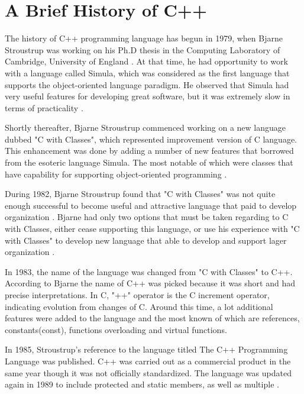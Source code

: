 \documentclass[11pt]{report}
\begin{document}
\section{A Brief History of C++}
\label{sec: History of C++}
The history of C++ programming language has begun in 1979, when Bjarne Stroustrup was working on his Ph.D thesis in the Computing Laboratory of Cambridge, University of England \cite{StroustrupHistory}. At that time, he had opportunity to work with a language called Simula, which was considered as the first language that supports the object-oriented language paradigm. He observed that Simula had very useful features for developing great software, but it was extremely slow in terms of practicality \cite{Stroustrup:2012:Cpp11}.

Shortly thereafter, Bjarne Stroustrup commenced working on a new language dubbed "C with Classes", which represented improvement version of C language. This enhancement was done by adding a number of new features that borrowed from the esoteric language Simula. The most notable of which were classes that have capability for supporting object-oriented programming \cite{StroustrupHistory}. 

During 1982, Bjarne Stroustrup found that "C with Classes" was not quite enough successful to become useful and attractive language that paid to develop organization \cite{StroustrupHistory}. Bjarne had only two options that must be taken regarding to C with Classes, either cease supporting this language, or use his experience with "C with Classes" to develop new language that able to develop and support lager organization \cite{Stroustrup:1994:DesignEvolution}.

In 1983, the name of the language was changed from "C with Classes" to C++. According to Bjarne \cite{Stroustrup:1994:DesignEvolution} the name of C++ was picked because it was short and had precise interpretations. In C, "++" operator is the C increment operator, indicating evolution from changes of C.  Around this time, a lot additional features were added to the language and the most known of which are references, constants(const), functions overloading and virtual functions.

In 1985, Stroustrup's reference to the language titled The C++ Programming Language was published. C++ was carried out as a commercial product in the same year though it was not officially standardized. The language was updated again in 1989 to include protected and static members, as well as multiple \cite{CplusplusHistoryofCpp}.
\end{document}

